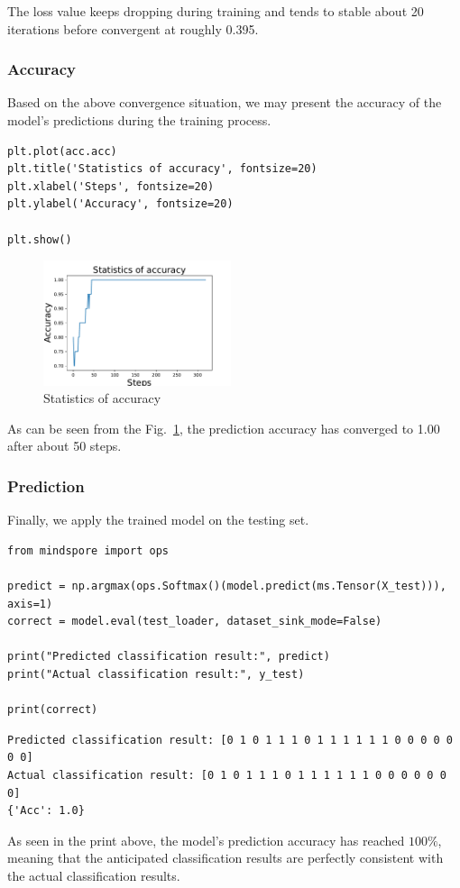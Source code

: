 The loss value keeps dropping during training and tends to stable about 20 iterations before convergent at roughly 0.395.

\subsubsection{Accuracy}
Based on the above convergence situation, we may present the accuracy of the model's predictions during the training process. %

\begin{lstlisting}
plt.plot(acc.acc)
plt.title('Statistics of accuracy', fontsize=20)
plt.xlabel('Steps', fontsize=20)
plt.ylabel('Accuracy', fontsize=20)

plt.show()   
\end{lstlisting}

\begin{figure}[H]
    \centering
    \includegraphics[width=0.49\textwidth]{5.1_figures/Statistics_of_accuracy.pdf}
    \caption{Statistics of accuracy}
    \label{5.1Statistics_of_accuracy}
\end{figure}

As can be seen from the Fig.~\ref{5.1Statistics_of_accuracy}, the prediction accuracy has converged to 1.00 after about 50 steps.

\subsubsection{Prediction}
Finally, we apply the trained model on the testing set.
\begin{lstlisting}
from mindspore import ops    

predict = np.argmax(ops.Softmax()(model.predict(ms.Tensor(X_test))), axis=1)    
correct = model.eval(test_loader, dataset_sink_mode=False)                   

print("Predicted classification result:", predict)
print("Actual classification result:", y_test)                                               

print(correct)                                                               
\end{lstlisting}

\begin{lstlisting}
Predicted classification result: [0 1 0 1 1 1 0 1 1 1 1 1 1 0 0 0 0 0 0 0]
Actual classification result: [0 1 0 1 1 1 0 1 1 1 1 1 1 0 0 0 0 0 0 0]
{'Acc': 1.0}
\end{lstlisting}

As seen in the print above, the model's prediction accuracy has reached $100\%$, meaning that the anticipated classification results are perfectly consistent with the actual classification results.


